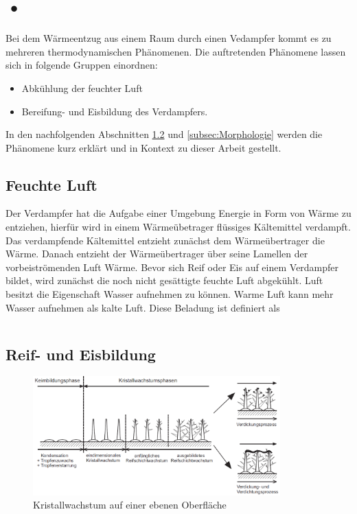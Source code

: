 \section{•}
\label{•}

Bei dem Wärmeentzug aus einem Raum durch einen Vedampfer kommt es zu mehreren thermodynamischen Phänomenen. Die auftretenden Phänomene lassen sich in folgende Gruppen einordnen:

\begin{itemize}
\item	Abkühlung der feuchter Luft 
\item	Bereifung- und Eisbildung des Verdampfers.
\end{itemize}

In den nachfolgenden Abschnitten \ref{subsec:Reif- und Eisbildung} und \ref{subsec:Morphologie} werden die Phänomene kurz erklärt und in Kontext zu dieser Arbeit gestellt. 

\subsection{Feuchte Luft}
\label{subsec:Feuchte Luft}

Der Verdampfer hat die Aufgabe einer Umgebung Energie in Form von Wärme zu entziehen, hierfür wird in einem Wärmeübetrager flüssiges Kältemittel verdampft. Das verdampfende Kältemittel entzieht zunächst dem Wärmeübertrager die Wärme. Danach entzieht der Wärmeübertrager über seine Lamellen der vorbeiströmenden Luft Wärme. 
Bevor sich Reif oder Eis auf einem Verdampfer bildet, wird zunächst die noch nicht gesättigte feuchte Luft abgekühlt. Luft besitzt die Eigenschaft Wasser aufnehmen zu können. Warme Luft kann mehr Wasser aufnehmen als kalte Luft. Diese Beladung ist definiert als 

\begin{equation}

\label{Beladung}
\end{equation}



\subsection{Reif- und Eisbildung}
\label{subsec:Reif- und Eisbildung}

\begin{figure}[htb]
\centering		\includegraphics[width=0.85\textwidth]{Pictures/Reifbildungsphasen_Schydlo.png}
\caption{Kristallwachstum auf einer ebenen Oberfläche \citep{Schydlo2010}}
\label{fig:einfacher Kältekreislauf}
\end{figure}

